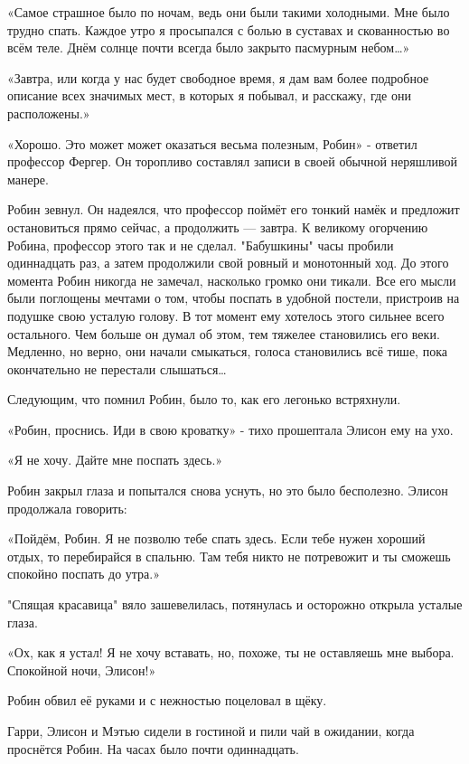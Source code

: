 \documentclass[a4paper,12pt]{book}
\begin{document}
\par
«Самое страшное было по ночам, ведь они были такими холодными. Мне было трудно спать. Каждое утро я просыпался с болью в суставах и скованностью во всём теле. Днём солнце почти всегда было закрыто пасмурным небом…»
\par
«Завтра, или когда у нас будет свободное время, я дам вам более подробное описание всех значимых мест, в которых я побывал, и расскажу, где они расположены.»
\par
«Хорошо. Это может может оказаться весьма полезным, Робин» - ответил профессор Фергер. Он торопливо составлял записи в своей обычной неряшливой манере.
\par
Робин зевнул. Он надеялся, что профессор поймёт его тонкий намёк и предложит остановиться прямо сейчас, а продолжить — завтра. К великому огорчению Робина, профессор этого так и не сделал. "Бабушкины" часы пробили одиннадцать раз, а затем продолжили свой ровный и монотонный ход. До этого момента Робин никогда не замечал, насколько громко они тикали. Все его мысли были поглощены мечтами о том, чтобы поспать в удобной постели, пристроив на подушке свою усталую голову. В тот момент ему хотелось этого сильнее всего остального. Чем больше он думал об этом, тем тяжелее становились его веки. Медленно, но верно, они начали смыкаться, голоса становились всё тише, пока окончательно не перестали слышаться…
\par
Следующим, что помнил Робин, было то, как его легонько встряхнули.
\par
«Робин, проснись. Иди в свою кроватку» - тихо прошептала Элисон ему на ухо.
\par
«Я не хочу. Дайте мне поспать здесь.»
\par
Робин закрыл глаза и попытался снова уснуть, но это было бесполезно. Элисон продолжала говорить:
\par
«Пойдём, Робин. Я не позволю тебе спать здесь. Если тебе нужен хороший отдых, то перебирайся в спальню. Там тебя никто не потревожит и ты сможешь спокойно поспать до утра.»
\par
"Спящая красавица" вяло зашевелилась, потянулась и осторожно открыла усталые глаза.
\par
«Ох, как я устал! Я не хочу вставать, но, похоже, ты не оставляешь мне выбора. Спокойной ночи, Элисон!»
\par
Робин обвил её руками и с нежностью поцеловал в щёку.\\
\par
Гарри, Элисон и Мэтью сидели в гостиной и пили чай в ожидании, когда проснётся Робин. На часах было почти одиннадцать.
\end{document}
